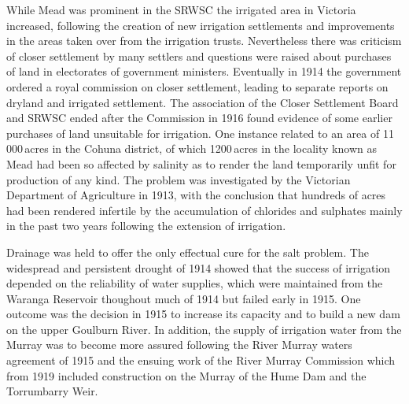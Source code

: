 While Mead was prominent in the SRWSC the irrigated area in Victoria
increased, following the creation of new irrigation settlements and
improvements in the areas taken over from the irrigation trusts.
Nevertheless there was criticism of closer settlement by many settlers
and questions were raised about purchases of land in electorates of
government ministers.  Eventually in 1914 the government ordered a
royal commission on closer settlement, leading to separate reports on
dryland and irrigated settlement.  The association of the Closer
Settlement Board and SRWSC ended after the Commission in 1916 found
evidence of some earlier purchases of land unsuitable for irrigation.
One instance related to an area of 11\,000\,acres in the
Cohuna district, of which 1200\,acres in the
locality known as Mead had been so affected by salinity
 as to render the land temporarily unfit for
production of any kind.  The problem was investigated by the Victorian
Department of Agriculture in 1913, with the conclusion that hundreds
of acres had been rendered infertile by the accumulation of chlorides
and sulphates mainly in the past two years following the extension of
irrigation.

Drainage  was held to offer the only effectual cure
for the salt problem.  The widespread and persistent
drought of 1914 showed that the success of irrigation
depended on the reliability of water supplies, wh\-ich were maintained
from the Waranga Reservoir thoughout much of 1914 but failed early in
1915.  One outcome was the decision in 1915 to increase its capacity
and to build a new dam on the upper Goulburn
River.  In addition, the supply of irrigation
water from the Murray was to become more assured following the River
Murray waters agreement of 1915 and the ensuing work of the River
Murray Commission which from 1919 included construction on the Murray
of the Hume Dam   and the
Torrumbarry Weir.

